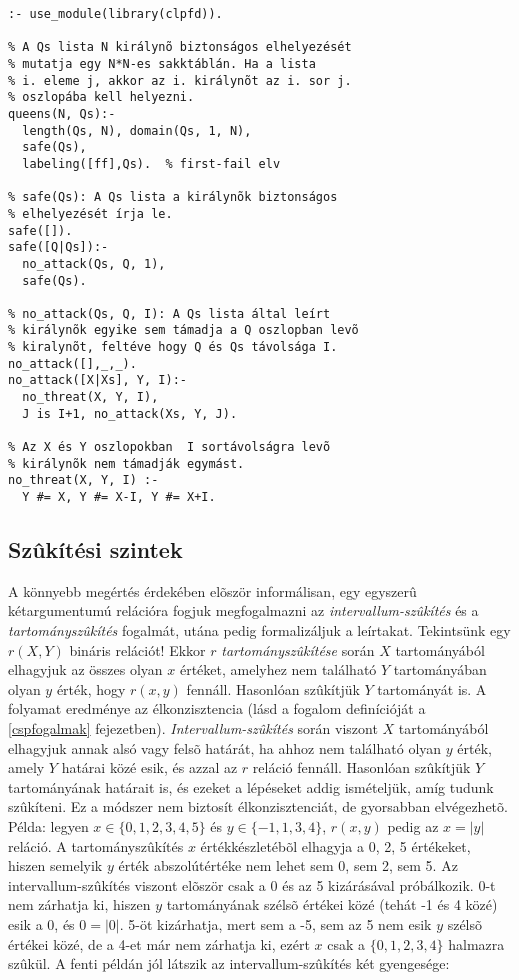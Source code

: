 \begin{verbatim}
:- use_module(library(clpfd)).

% A Qs lista N királynõ biztonságos elhelyezését
% mutatja egy N*N-es sakktáblán. Ha a lista
% i. eleme j, akkor az i. királynõt az i. sor j.
% oszlopába kell helyezni.
queens(N, Qs):-
  length(Qs, N), domain(Qs, 1, N),
  safe(Qs),
  labeling([ff],Qs).  % first-fail elv

% safe(Qs): A Qs lista a királynõk biztonságos
% elhelyezését írja le.
safe([]).
safe([Q|Qs]):-
  no_attack(Qs, Q, 1),
  safe(Qs).

% no_attack(Qs, Q, I): A Qs lista által leírt
% királynõk egyike sem támadja a Q oszlopban levõ
% kiralynõt, feltéve hogy Q és Qs távolsága I.
no_attack([],_,_).
no_attack([X|Xs], Y, I):-
  no_threat(X, Y, I),
  J is I+1, no_attack(Xs, Y, J).

% Az X és Y oszlopokban  I sortávolságra levõ
% királynõk nem támadják egymást.
no_threat(X, Y, I) :-
  Y #= X, Y #= X-I, Y #= X+I.
\end{verbatim}



\subsection{Szûkítési szintek}
\label{szukites}

A könnyebb megértés érdekében elõször informálisan, egy egyszerû
kétargumentumú relációra fogjuk megfogalmazni az \emph{intervallum-szûkítés}
és a \emph{tartományszûkítés} fogalmát, utána pedig formalizáljuk a
leírtakat.
\br
Tekintsünk egy $r(X,Y)$ bináris relációt! Ekkor $r$ \emph{tartományszûkítése}
során $X$ tartományából elhagyjuk az összes olyan $x$ értéket, amelyhez nem
található $Y$ tartományában olyan $y$ érték, hogy $r(x,y)$ fennáll. Hasonlóan
szûkítjük $Y$ tartományát is. A folyamat eredménye az élkonzisztencia (lásd
a fogalom definícióját a \ref{cspfogalmak} fejezetben).
\emph{Intervallum-szûkítés} során viszont $X$ tartományából elhagyjuk annak
alsó vagy felsõ határát, ha ahhoz nem található olyan $y$ érték, amely $Y$
határai közé esik, és azzal az $r$ reláció fennáll. Hasonlóan szûkítjük
$Y$ tartományának határait is, és ezeket a lépéseket addig ismételjük,
amíg tudunk szûkíteni. Ez a módszer nem biztosít élkonzisztenciát, de
gyorsabban elvégezhetõ.
\br
Példa: legyen $x \in \{0,1,2,3,4,5\}$ és $y \in \{-1,1,3,4\}$, $r(x,y)$ pedig
az $x=|y|$ reláció. A tartományszûkítés $x$ értékkészletébõl elhagyja
a 0, 2, 5 értékeket, hiszen semelyik $y$ érték abszolútértéke nem lehet
sem 0, sem 2, sem 5. Az intervallum-szûkítés viszont elõször csak a 0
és az 5 kizárásával próbálkozik. 0-t nem zárhatja ki, hiszen $y$ tartományának
szélsõ értékei közé (tehát -1 és 4 közé) esik a 0, és $0=|0|$. 5-öt
kizárhatja, mert sem a -5, sem az 5 nem esik $y$ szélsõ értékei közé,
de a 4-et már nem zárhatja ki, ezért $x$ csak a $\{0,1,2,3,4\}$ halmazra
szûkül.
\br
A fenti példán jól látszik az intervallum-szûkítés két gyengesége:

